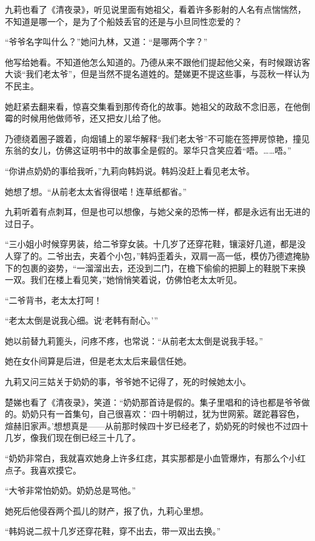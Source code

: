 \par 九莉也看了《清夜录》，听见说里面有她祖父，看着许多影射的人名有点惴惴然，不知道是哪一个，是为了个船妓丢官的还是与小旦同性恋爱的？
\par “爷爷名字叫什么？”她问九林，又道：“是哪两个字？”
\par 他写给她看。不知道他怎么知道的。乃德从来不跟他们提起他父亲，有时候跟访客大谈“我们老太爷”，但是当然不提名道姓的。楚娣更不提这些事，与蕊秋一样认为不民主。
\par 她赶紧去翻来看，惊喜交集看到那传奇化的故事。她祖父的政敌不念旧恶，在他倒霉的时候用他做师爷，还又把女儿给了他。
\par 乃德绕着圈子踱着，向烟铺上的翠华解释“我们老太爷”不可能在签押房惊艳，撞见东翁的女儿，仿佛这证明书中的故事全是假的。翠华只含笑应着“唔。……唔。”
\par “你讲点奶奶的事给我听，”九莉向韩妈说。韩妈没赶上看见老太爷。
\par 她想了想。“从前老太太省得很喏！连草纸都省。”
\par 九莉听着有点刺耳，但是也可以想像，与她父亲的恐怖一样，都是永远有出无进的过日子。
\par “三小姐小时候穿男装，给二爷穿女装。十几岁了还穿花鞋，镶滚好几道，都是没人穿了的。二爷出去，夹着个小包，”韩妈歪着头，双肩一高一低，模仿乃德遮掩胁下的包裹的姿势，“一溜溜出去，还没到二门，在檐下偷偷的把脚上的鞋脱下来换一双。我们在楼上看见笑，”她悄悄笑着说，仿佛怕老太太听见。
\par “二爷背书，老太太打呵！
\par “老太太倒是说我心细。说‘老韩有耐心。'”
\par 她以前替九莉篦头，问疼不疼，也常说：“从前老太太倒是说我手轻。”
\par 她在女仆间算是后进，但是老太太后来最信任她。
\par 九莉又问三姑关于奶奶的事，爷爷她不记得了，死的时候她太小。
\par 楚娣也看了《清夜录》，笑道：“奶奶那首诗是假的。集子里唱和的诗也都是爷爷做的。奶奶只有一首集句，自己很喜欢：‘四十明朝过，犹为世网萦。蹉跎暮容色，煊赫旧家声。’想想真是——从前那时候四十岁已经老了，奶奶死的时候也不过四十几岁，像我们现在倒已经三十几了。
\par “奶奶非常白，我就喜欢她身上许多红痣，其实那都是小血管爆炸，有那么个小红点子。我喜欢摸它。
\par “大爷非常怕奶奶。奶奶总是骂他。”
\par 她死后他侵吞两个孤儿的财产，报了仇，九莉心里想。
\par “韩妈说二叔十几岁还穿花鞋，穿不出去，带一双出去换。”
